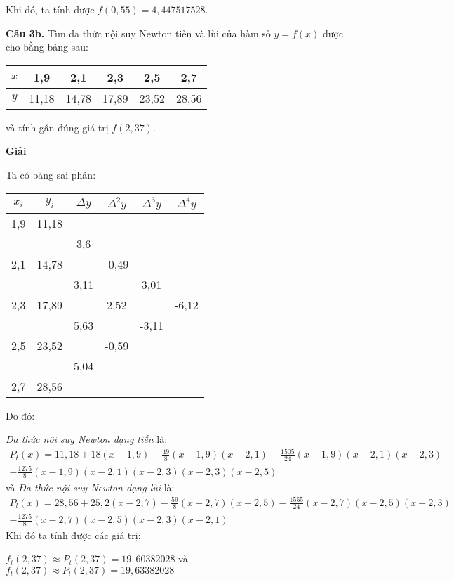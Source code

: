 Khi đó, ta tính được $f(0,55)=4,447517528$.\par

\textbf{Câu 3b.} Tìm đa thức nội suy Newton tiến và lùi của hàm số $y=f(x)$ được cho bằng bảng sau:\par
\begin{longtable}{|c|c|c|c|c|c|}\hline
	$x$ & 1,9 & 2,1 & 2,3 & 2,5 & 2,7 \\ \hline
	$y$ & 11,18 & 14,78 & 17,89 & 23,52 & 28,56 \\ \hline
\end{longtable}
và tính gần đúng giá trị $f(2,37)$.\par

\textbf{Giải}\par
Ta có bảng sai phân:
\begin{longtable}{|c|c|c|c|c|c|}\hline
	$x_i$&$y_i$&$\Delta y$& $\Delta^2 y$&$\Delta^3 y$&$\Delta^4 y$\\\hline
	\endhead
	1,9&11,18&& &&\\\hline
	&&3,6& &&\\\hline
	2,1&14,78&& -0,49&&\\\hline
	&&3,11& &3,01&\\\hline
	2,3&17,89&& 2,52&&-6,12\\\hline
	&&5,63& &-3,11&\\\hline
	2,5&23,52&& -0,59&&\\\hline
	&&5,04& &&\\\hline
	2,7&28,56&& &&\\\hline
\end{longtable}
Do đó:\par

\textit{Đa thức nội suy Newton dạng tiến} là:
\begin{multline*}
	P_t(x)=11,18 + 18(x-1,9) -\frac{49}{8}(x-1,9)(x-2,1) + \frac{1505}{24}(x-1,9)(x-2,1)(x-2,3)\\
	-\frac{1275}{8}(x-1,9)(x-2,1)(x-2,3)(x-2,3)(x-2,5)
\end{multline*}
và \textit{Đa thức nội suy Newton dạng lùi} là:
\begin{multline*}
	P_{l} (x)= 28,56 +25,2(x-2,7) -\frac{59}{8}(x-2,7)(x-2,5)-\frac{1555}{24}(x-2,7)(x-2,5)(x-2,3) \\
	-\frac{1275}{8}(x-2,7)(x-2,5)(x-2,3)(x-2,1)
\end{multline*}
Khi đó ta tính được các giá trị:
\begin{center}
	$f_t(2,37)\approx P_t(2,37)= 19,60382028$ và $f_l(2,37) \approx P_l(2,37)= 19,63382028$
\end{center}

